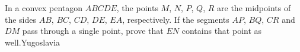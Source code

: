 In a convex pentagon $ABCDE$,  the points $M$,  $N$,  $P$,  $Q$,  $R$ are the midpoints of the sides $AB$,  $BC$,  $CD$,  $DE$,  $EA$,  respectively. If the segments $AP$,  $BQ$,  $CR$ and $DM$ pass through a single point, prove that $EN$ contains that point as well.Yugoslavia